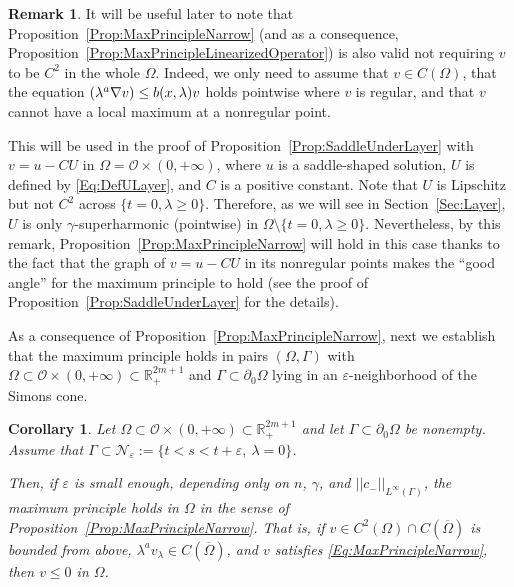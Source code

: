 \documentclass[twoside,leqno,symbols-for-thanks, draft]{rmi}
\numberwithin{equation}{section}
\newtheorem{corollary}[theorem]{Corollary}
\theoremstyle{definition}
\newtheorem{remark}[theorem]{Remark}
\newcommand{\con}[1]{\mathbb{#1}}
\newcommand{\R}{\con{R}} %
\newcommand{\ncal}{\mathcal{N}}
\newcommand{\ocal}{\mathcal{O}}
\newcommand{\norm}[1]{\left | \left |{#1} \right | \right |}
\newcommand{\s}{\gamma}
\let\div\relax
\DeclareMathOperator{\div}{div}
\begin{document}
\begin{remark}
	\label{Remark:WeakMPNarrow}
	It will be useful later to note that Proposition~\ref{Prop:MaxPrincipleNarrow} (and as a consequence, Proposition~\ref{Prop:MaxPrincipleLinearizedOperator}) is also valid not requiring $v$ to be $C^2$ in the whole $\Omega$. Indeed, we only need to assume that $v\in C(\Omega)$, that the equation $\div (\lambda^a \nabla v) \leq b(x,\lambda)v$ holds pointwise where $v$ is regular, and that $v$ cannot have a local maximum at a nonregular point.
	
	This will be used in the proof of Proposition~\ref{Prop:SaddleUnderLayer} with $v = u- CU$ in $\Omega = \ocal \times (0,+\infty)$, where $u$ is a saddle-shaped solution, $U$ is defined by \eqref{Eq:DefULayer}, and $C$ is a positive constant. Note that $U$ is Lipschitz but not $C^2$ across $\{t=0, \lambda\geq 0\}$. Therefore, as we will see in Section~\ref{Sec:Layer}, $U$ is only $\s$-superharmonic (pointwise) in $\Omega \setminus \{t=0, \lambda\geq 0\}$. Nevertheless, by this remark, Proposition~\ref{Prop:MaxPrincipleNarrow} will hold in this case thanks to the fact that the graph of $v = u-CU$ in its nonregular points makes the ``good angle'' for the maximum principle to hold (see the proof of Proposition~\ref{Prop:SaddleUnderLayer} for the details).
\end{remark}

As a consequence of Proposition~\ref{Prop:MaxPrincipleNarrow}, next we establish that the maximum principle holds in pairs $(\Omega, \Gamma)$ with $ \Omega \subset \ocal \times (0, +\infty) \subset \R^{2m+1}_+$ and $\Gamma \subset \partial_0  \Omega$ lying in an $\varepsilon$-neighborhood of the Simons cone.

\begin{corollary}
	\label{Cor:MaxPrincipleNarrowSaddle}
	Let $\Omega\subset \ocal \times (0, +\infty) \subset \R^{2m + 1}_+$ and let $\Gamma \subset \partial_0 \Omega$ be nonempty. Assume that $\Gamma \subset \ncal_\varepsilon := \{t < s < t+\varepsilon, \ \lambda= 0 \}$. 
	
	Then, if $\varepsilon$ is small enough, depending only on $n$, $\s$, and $\norm{c_-}_{L^\infty(\Gamma)}$, the maximum principle holds in $\Omega$ in the sense of Proposition~\ref{Prop:MaxPrincipleNarrow}. That is, if $v \in C^2 (\Omega)\cap C(\overline{\Omega})$ is bounded from above, $\lambda^a v_\lambda \in C (\overline{\Omega})$, and $v$ satisfies \eqref{Eq:MaxPrincipleNarrow}, then $v\leq 0$ in $\Omega$.
\end{corollary}
\end{document}
